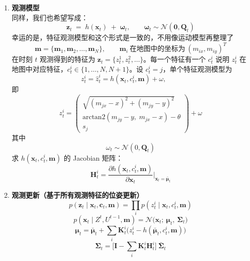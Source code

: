 \documentclass[../main.tex]{subfiles}
\begin{document}
\begin{enumerate}
{{\begin{enumerate}
    
    \item \textbf{观测模型}\\
    同样，我们也希望写成：
    $$
    \mathbf{z}_t \;=\; h(\mathbf{x}_t) \;+\; \boldsymbol{\omega}_t,\qquad \boldsymbol{\omega}_t\sim\mathcal{N}(\mathbf{0},\mathbf{Q}_t)
    $$
    幸运的是，特征观测模型和这个形式是一致的，不用像运动模型再整理了
    $$
    \mathbf{m}=\{ \mathbf{m}_1,\mathbf{m}_2,\ldots,\mathbf{m}_N\},\qquad
    \mathbf{m}_i\ \text{在地图中的坐标为}\ (m_{ix},m_{iy})^T
    $$
    在时刻 $t$ 观测得到的特征为 $ \mathbf{z}_t = \{ z_t^1,z_t^2,\ldots\}$。每一个特征有一个 $c_t^i$ 说明 $z_t^i$ 在地图中对应特征，$c_t^i\in\{1,\ldots,N,N+1\}$。设 $c_t^i=j$，单个特征观测模型为
    $$
    z_t^i =
    \hat{z}_t^i = h(\mathbf{x}_t, c_t^i, \mathbf{m})
    + \omega,\qquad
    $$
    即
    $$
    z_t^i =
    \begin{pmatrix}
      \sqrt{(m_{jx}-x)^2 + (m_{jy}-y)^2} \\[6pt]
      \mathrm{arctan2}(m_{jy}-y,\; m_{jx}-x) - \theta \\[6pt]
      s_j
    \end{pmatrix}
    + \omega
    $$
    其中
    $$\omega_t \sim \mathcal{N}(0,\mathbf{Q}_t)$$
    求 $h(\mathbf{x}_t, c_t^i, \mathbf{m})$ 的 Jacobian 矩阵：
    $$
    \mathbf{H}_t^i = \frac{\partial h(\mathbf{x}_t, c_t^i, \mathbf{m})}{\partial \mathbf{x}_t}\bigg|_{\mathbf{x}_t=\bar{\boldsymbol{\mu}}_t}
    $$
    
    \item \textbf{观测更新（基于所有观测特征的位姿更新）}
    $$
    p(\mathbf{z}_t \mid \mathbf{x}_t, \mathbf{c}_t, \mathbf{m}) = \prod_i p(z_t^i \mid \mathbf{x}_t, c_t^i, \mathbf{m})
    $$
    $$
    p(\mathbf{x}_t \mid Z^t, U^{t-1}, \mathbf{m}) = \mathcal{N}\big(\mathbf{x}_t;\ \boldsymbol{\mu}_t,\ \boldsymbol{\Sigma}_t\big)
    $$
    $$
    \boldsymbol{\mu}_t = \bar{\boldsymbol{\mu}}_t + \sum_i \mathbf{K}_t^i\big(z_t^i - h(\bar{\boldsymbol{\mu}}_t, c_t^i, \mathbf{m})\big)
    $$
    $$
    \boldsymbol{\Sigma}_t = \big[\mathbf{I} - \sum_i \mathbf{K}_t^i \mathbf{H}_t^i\big]\ \bar{\boldsymbol{\Sigma}}_t
    $$
    

\end{enumerate}}}
\end{enumerate}
\end{document}
